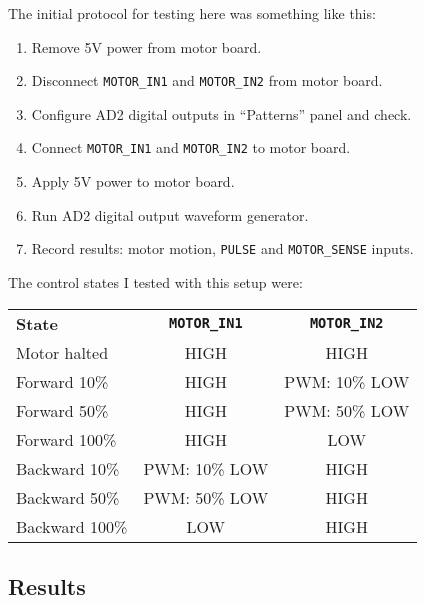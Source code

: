 \documentclass[a4paper,11pt]{article}
\begin{document}
The initial protocol for testing here was something like this:
\begin{enumerate}
  \item{Remove 5V power from motor board.}
  \item{Disconnect \texttt{MOTOR\_IN1} and \texttt{MOTOR\_IN2} from
    motor board.}
  \item{Configure AD2 digital outputs in ``Patterns'' panel and
    check.}
  \item{Connect \texttt{MOTOR\_IN1} and \texttt{MOTOR\_IN2} to motor
    board.}
  \item{Apply 5V power to motor board.}
  \item{Run AD2 digital output waveform generator.}
  \item{Record results: motor motion, \texttt{PULSE} and
    \texttt{MOTOR\_SENSE} inputs.}
\end{enumerate}

The control states I tested with this setup were:
\begin{center}
  \begin{tabular}{lcc}
    \textbf{State} & \textbf{\texttt{MOTOR\_IN1}} &
    \textbf{\texttt{MOTOR\_IN2}} \\

    Motor halted   & HIGH           & HIGH \\
    Forward 10\%   & HIGH           & PWM: 10\% LOW \\
    Forward 50\%   & HIGH           & PWM: 50\% LOW \\
    Forward 100\%  & HIGH           & LOW \\
    Backward 10\%  & PWM: 10\% LOW  & HIGH \\
    Backward 50\%  & PWM: 50\% LOW  & HIGH \\
    Backward 100\% & LOW            & HIGH
  \end{tabular}
\end{center}

\subsection*{Results}
\end{document}
